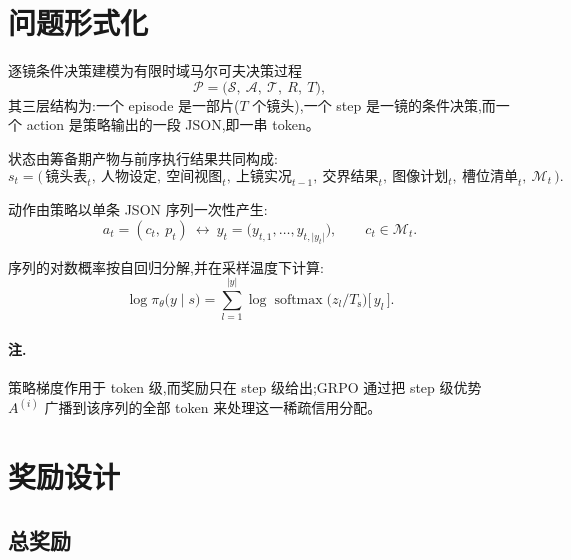 \documentclass[UTF8, 11pt]{ctexart}
\DeclareMathOperator{\softmax}{softmax}
\begin{document}
\section{问题形式化}

逐镜条件决策建模为有限时域马尔可夫决策过程
\begin{equation}
\mathcal{P}=\bigl(\mathcal{S},\ \mathcal{A},\ \mathcal{T},\ R,\ T\bigr),
\label{eq:mdp}
\end{equation}
其三层结构为:一个 episode 是一部片($T$ 个镜头),一个 step 是一镜的条件决策,而一个 action 是策略输出的一段 JSON,即一串 token。

状态由筹备期产物与前序执行结果共同构成:
\begin{equation}
s_t=\bigl(\,\text{镜头表}_t,\ \text{人物设定},\ \text{空间视图}_t,\ \text{上镜实况}_{t-1},\ \text{交界结果}_t,\ \text{图像计划}_t,\ \text{槽位清单}_t,\ \mathcal{M}_t\,\bigr).
\label{eq:state}
\end{equation}

动作由策略以单条 JSON 序列一次性产生:
\begin{equation}
a_t=(c_t,\ p_t)\ \longleftrightarrow\ y_t=\bigl(y_{t,1},\dots,y_{t,\lvert y_t\rvert}\bigr),
\qquad c_t\in\mathcal{M}_t .
\label{eq:action}
\end{equation}

序列的对数概率按自回归分解,并在采样温度下计算:
\begin{equation}
\log\pi_\theta\bigl(y\mid s\bigr)
=\sum_{l=1}^{\lvert y\rvert}
\log\softmax\!\bigl(z_l/T_{\text{s}}\bigr)\bigl[\,y_l\,\bigr].
\label{eq:seqlogprob}
\end{equation}

\paragraph{注.} 策略梯度作用于 token 级,而奖励只在 step 级给出;GRPO 通过把 step 级优势 $A^{(i)}$ 广播到该序列的全部 token 来处理这一稀疏信用分配。

\section{奖励设计}

\subsection{总奖励}
\end{document}
